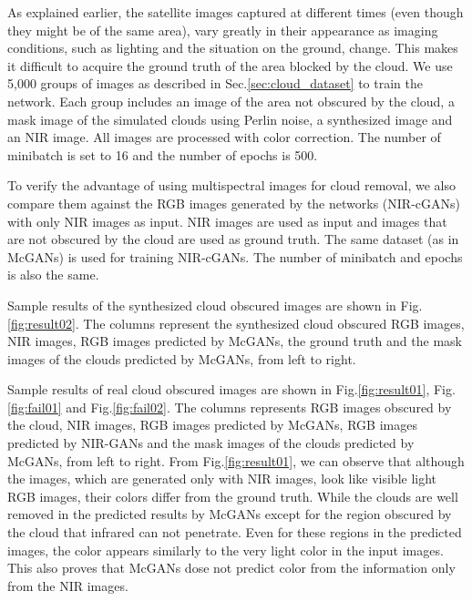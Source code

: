 \documentclass[10pt,twocolumn,letterpaper]{article}
\begin{document}
As explained earlier, the satellite images captured at different times (even though they might be of the same area), vary greatly in their appearance as imaging conditions, such as lighting and the situation on the ground, change. This makes it difficult to acquire the ground truth of the area blocked by the cloud. We use 5,000 groups of images as described in Sec.\ref{sec:cloud_dataset} to train the network. Each group includes an image of the area not obscured by the cloud, a mask image of the simulated clouds using Perlin noise, a synthesized image and an NIR image. All images are 
 processed with color correction. The number of minibatch is set to 16 and the number of epochs is 500.

To verify the advantage of using multispectral images for cloud removal, we also compare them against the RGB images generated by the networks (NIR-cGANs) with only NIR images as input. NIR images are used as input and images that are not obscured by the cloud are used as ground truth. The same dataset (as in McGANs) is used for training  NIR-cGANs. The number of minibatch and epochs is also the same.

Sample results of the synthesized cloud obscured images are shown in Fig.\ref{fig:result02}. The columns represent the synthesized cloud obscured RGB images, NIR images, RGB images predicted by McGANs, the ground truth and the mask images of the clouds predicted by McGANs, from left to right.

Sample results of real cloud obscured images are shown in Fig.\ref{fig:result01}, Fig.\ref{fig:fail01} and Fig.\ref{fig:fail02}. The columns represents RGB images obscured by the cloud, NIR images, RGB images predicted by McGANs, RGB images predicted by NIR-GANs and the mask images of the clouds predicted by McGANs, from left to right.
From Fig.\ref{fig:result01}, we can observe that although the images, which are generated  only with NIR images, look like visible light RGB images, their colors differ from the ground truth.
While the clouds are well removed in the predicted results by McGANs except for the region obscured by the cloud that infrared can not penetrate. Even for these regions in the predicted images, the color appears similarly to the very light color in the input images. This also proves that McGANs dose not predict color from the information only  from the NIR images.
\end{document}
